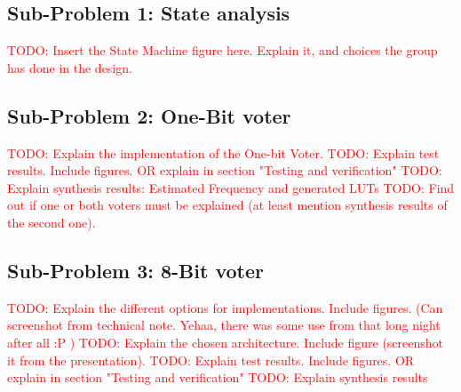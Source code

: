 \documentclass[a4paper]{IEEEtran}
\newcommand\TODO[1]{\textcolor{red}{TODO:#1}}
\newcommand\todo[1]{\TODO{#1}}
\begin{document}
\subsection{Sub-Problem 1: State analysis}
\todo{ Insert the State Machine figure here. Explain it, and choices the group has done in the design. }

\subsection{Sub-Problem 2: One-Bit voter}
\todo{ Explain the implementation of the One-bit Voter.}
\break 
\break
\todo{ Explain test results. Include figures. OR explain in section "Testing and verification" }
\break
\break
\todo{ Explain synthesis results: Estimated Frequency and generated LUTs}
\break
\break
\todo{ Find out if one or both voters must be explained (at least mention synthesis results of the second one). }

\subsection{Sub-Problem 3: 8-Bit voter}
\todo{ Explain the different options for implementations. Include figures. (Can screenshot from technical note. Yehaa, there was some use from that long night after all :P ) }
\break
\break
\todo{ Explain the chosen architecture. Include figure (screenshot it from the presentation). }
\break
\break
\todo{ Explain test results. Include figures. OR explain in section "Testing and verification" }
\break
\break
\todo{ Explain synthesis results}
\break
\break
\end{document}
